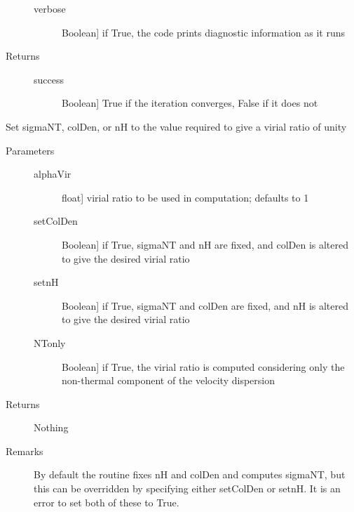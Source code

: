 \documentclass[letterpaper,10pt,english]{sphinxmanual}
\begin{document}
\begin{fulllineitems}
\begin{fulllineitems}
\begin{description}
\begin{description}
\item[{verbose}] \leavevmode{[}Boolean{]}
if True, the code prints diagnostic information as it runs

\end{description}

\item[{Returns}] \leavevmode\begin{description}
\item[{success}] \leavevmode{[}Boolean{]}
True if the iteration converges, False if it does not

\end{description}

\end{description}

\end{fulllineitems}


\begin{fulllineitems}
\label{fulldoc:despotic.cloud.setVirial}
Set sigmaNT, colDen, or nH to the value required to give a
virial ratio of unity
\begin{description}
\item[{Parameters}] \leavevmode\begin{description}
\item[{alphaVir}] \leavevmode{[}float{]}
virial ratio to be used in computation; defaults to 1

\item[{setColDen}] \leavevmode{[}Boolean{]}
if True, sigmaNT and nH are fixed, and colDen is
altered to give the desired virial ratio

\item[{setnH}] \leavevmode{[}Boolean{]}
if True, sigmaNT and colDen are fixed, and nH is altered
to give the desired virial ratio

\item[{NTonly}] \leavevmode{[}Boolean{]}
if True, the virial ratio is computed considering only the
non-thermal component of the velocity dispersion

\end{description}

\item[{Returns}] \leavevmode
Nothing

\item[{Remarks}] \leavevmode
By default the routine fixes nH and colDen and computes
sigmaNT, but this can be overridden by specifying either
setColDen or setnH. It is an error to set both of these to
True.


\end{description}
\end{fulllineitems}
\end{fulllineitems}
\end{document}
